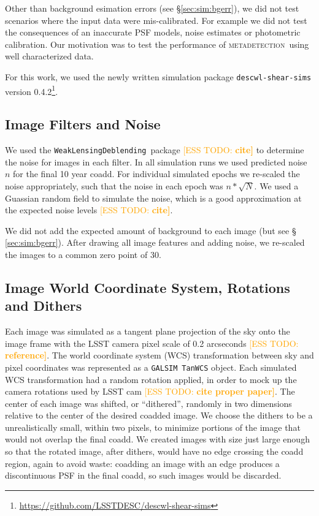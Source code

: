 \documentclass[twocolumn,twocolappendix,astrosym]{openjournal}
\newcommand{\esstodo}[1]{\textcolor{orange}{[ESS TODO: \bf #1]}}
\newcommand{\descwl}{\texttt{WeakLensingDeblending}}
\newcommand{\galsim}{\texttt{GALSIM}}
\newcommand{\mdet}{\textsc{metadetection}}
\begin{document}
Other than background esimation errors (see \S \ref{sec:sim:bgerr}), we did not
test scenarios where the input data were mis-calibrated.  For example we did
not test the consequences of an inaccurate PSF models, noise estimates or
photometric calibration.  Our motivation was to test the performance of \mdet\
using well characterized data.

For this work, we used the newly written simulation package
\texttt{descwl-shear-sims} version
0.4.2\footnote{\url{https://github.com/LSSTDESC/descwl-shear-sims}}.

\subsection{Image Filters and Noise} \label{sec:sim:noise}

We used the \descwl\ package \esstodo{cite} to determine the
noise for images in each filter.  In all simulation runs we used predicted
noise $n$ for the final 10 year coadd.  For individual simulated epochs we
re-scaled the noise appropriately, such that the noise in each epoch was $n *
\sqrt{N}$.  We used a Guassian random field to simulate the noise, which is a
good approximation at the expected noise levels \esstodo{cite}.

We did not add the expected amount of background to each image (but see \S
\ref{sec:sim:bgerr}).  After drawing all image features and adding
noise, we re-scaled the images to a common zero point of 30.

\subsection{Image World Coordinate System, Rotations and Dithers} \label{sec:sim:rotdith}

Each image was simulated as a tangent plane projection of the sky onto the
image frame with the LSST camera pixel scale of 0.2 arcseconds \esstodo{reference}.
The world coordinate system (WCS) transformation between sky and pixel
coordinates was represented as a \galsim\ \texttt{TanWCS} object.  Each
simulated WCS transformation had a random rotation applied, in order to mock up
the camera rotations used by LSST cam \esstodo{cite proper paper}.  The center of
each image was shifted, or ``dithered'', randomly in two dimensions relative to
the center of the desired coadded image.  We choose the dithers to be a
unrealistically small, within two pixels, to minimize portions of the image
that would not overlap the final coadd.  We created images with size just large enough
so that the rotated image, after dithers, would have no edge crossing the coadd
region, again to avoid waste:  coadding an image with an edge produces a
discontinuous PSF in the final coadd, so such images would be discarded.
\end{document}

